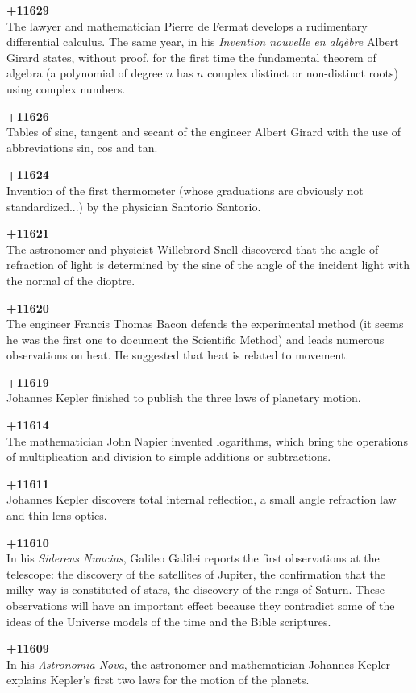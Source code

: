 \textbf{+11629}\\
The lawyer and mathematician Pierre de Fermat develops a rudimentary differential calculus. The same year, in his \textit{Invention nouvelle en algèbre} Albert Girard states, without proof, for the first time the fundamental theorem of algebra (a polynomial of degree $n$ has $n$ complex distinct or non-distinct roots) using complex numbers.

\textbf{+11626}\\
Tables of sine, tangent and secant of the engineer Albert Girard with the use of abbreviations sin, cos and tan.

\textbf{+11624}\\
Invention of the first thermometer (whose graduations are obviously not standardized...) by the physician Santorio Santorio.

\textbf{+11621}\\
The astronomer and physicist Willebrord Snell discovered that the angle of refraction of light is determined by the sine of the angle of the incident light with the normal of the dioptre.

\textbf{+11620}\\
The engineer Francis Thomas Bacon defends the experimental method (it seems he was the first one to document the Scientific Method) and leads numerous observations on heat. He suggested that heat is related to movement.

\textbf{+11619}\\
Johannes Kepler finished to publish the three laws of planetary motion.

\textbf{+11614}\\
The mathematician John Napier invented logarithms, which bring the operations of multiplication and division to simple additions or subtractions.

\textbf{+11611}\\
Johannes Kepler discovers total internal reflection, a small angle refraction law and thin lens optics.

\textbf{+11610}\\ In his \textit{Sidereus Nuncius}, Galileo Galilei reports the first observations at the telescope: the discovery of the satellites of Jupiter, the confirmation that the milky way is constituted of stars, the discovery of the rings of Saturn. These observations will have an important effect because they contradict some of the ideas of the Universe models of the time and the Bible scriptures.

\textbf{+11609}\\
In his \textit{Astronomia Nova}, the astronomer and mathematician Johannes Kepler explains Kepler's first two laws for the motion of the planets.

